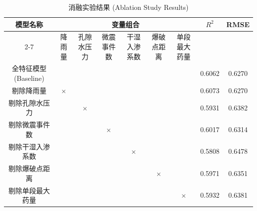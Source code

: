 \begin{table}[htbp]
	\centering
	\caption{消融实验结果 (Ablation Study Results)}
	\label{tab:ablation}
	\begin{tabular}{|c|c|c|c|c|c|c|c|c|}
		\hline
		\multirow{2}{*}{模型名称} & \multicolumn{6}{c|}{变量组合} & \multirow{2}{*}{$R^{2}$} & \multirow{2}{*}{RMSE} \\
		\cline{2-7}
		& 降雨量 & 孔隙水压力 & 微震事件数 & 干湿入渗系数 & 爆破点距离 & 单段最大药量 & & \\
		\hline
		全特征模型 (Baseline) & \checkmark & \checkmark & \checkmark & \checkmark & \checkmark & \checkmark & 0.6062 & 0.6270 \\
		\hline
		剔除降雨量 & $\times$ & \checkmark & \checkmark & \checkmark & \checkmark & \checkmark & 0.6073 & 0.6270 \\
		\hline
		剔除孔隙水压力 & \checkmark & $\times$ & \checkmark & \checkmark & \checkmark & \checkmark & 0.5931 & 0.6382 \\
		\hline
		剔除微震事件数 & \checkmark & \checkmark & $\times$ & \checkmark & \checkmark & \checkmark & 0.6017 & 0.6314 \\
		\hline
		剔除干湿入渗系数 & \checkmark & \checkmark & \checkmark & $\times$ & \checkmark & \checkmark & 0.5808 & 0.6478 \\
		\hline
		剔除爆破点距离 & \checkmark & \checkmark & \checkmark & \checkmark & $\times$ & \checkmark & 0.5971 & 0.6351 \\
		\hline
		剔除单段最大药量 & \checkmark & \checkmark & \checkmark & \checkmark & \checkmark & $\times$ & 0.5932 & 0.6381 \\
		\hline
	\end{tabular}
\end{table}
